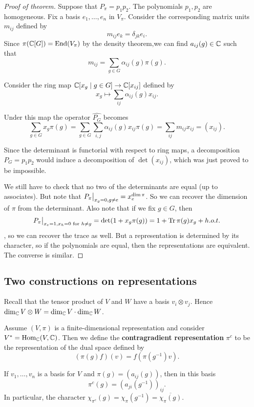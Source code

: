\documentclass[11pt, english]{article}
\begin{document}
\begin{proof}[Proof of theorem]
  
Suppose that $P_\pi=p_1p_2$. The polynomials $p_1,p_2$ are homogeneous. Fix a basis $e_1,\ldots,e_n$ in $V_\pi$. Consider the corresponding matrix units $m_{ij}$ defined by
$$
m_{ij} e_k = \delta_{jk}e_i.
$$
Since $\pi(\mathbb{C}[G]) = \operatorname{End}(V_\pi)$ by the density theorem,we can find $a_{ij}(g) \in \mathbb{C}$ such that
$$
m_{ij} = \sum_{g \in G} \alpha_{ij}(g) \pi(g).
$$

Consider the ring map $\mathbb{C}[x_g \mid g \in G] \to \mathbb{C}[x_{ij}]$ defined by
$$
x_g \mapsto \sum_{ij} \alpha_{ij}(g) x_{ij}.
$$

Under this map the operator $\widehat{P_G}$ becomes
$$
\sum_{g \in G} x_g \pi(g) = \sum_{g \in G} \sum_{i,j} \alpha_{ij}(g) x_{ij} \pi(g) = \sum_{ij} m_{ij} x_{ij} = (x_{ij}).
$$

Since the determinant is functorial with respect to ring maps, a decomposition $P_G=p_1p_2$ would induce a decomposition of $\det (x_{ij})$, which was just proved to be impossible.

We still have to check that no two of the determinants are equal (up to associates). But note that $\restr{P_\pi}{x_g = 0, g \neq e}=x_e^{\dim \pi}$. So we can recover the dimension of $\pi$ from the determinant. Also note that if we fix $g \in G$, then
$$
\restr{P_\pi}{x_e=1, x_h =0 \text{ for } h \neq g} = \det(1+x_g\pi(g))=1+\tr \pi(g)x_g + h.o.t.
$$,
so we can recover the trace as well. But a representation is determined by its character, so if the polynomials are equal, then the representations are equivalent. The converse is similar.
\end{proof}

\subsection{Two constructions on representations}

Recall that the tensor product of $V$ and $W$ have a basis $v_i \otimes v_j$. Hence $\dim_{\mathbb{C}} V \otimes W = \dim_{\mathbb{C}} V \cdot \dim_{\mathbb{C}} W$.

Assume $(V,\pi)$ is a finite-dimensional representation and consider $V^\ast = \operatorname{Hom}_{\mathbb{C}}(V,\mathbb{C})$. Then we define the \textbf{contragradient representation} $\pi^c$ to be the representation of the dual space defined by 
$$
(\pi(g)f)(v) = f(\pi(g^{-1})v).
$$

If $v_1,\ldots,v_n$ is a basis for $V$ and $\pi(g)=(a_{ij}(g))$, then in this basis 
$$
\pi^c(g) = (a_{ji}(g^{-1}))_{ij}.
$$
In particular, the character  $\chi_{\pi^c}(g)=\chi_\pi(g^{-1})=\overline{\chi_\pi(g)}$. 
\end{document}
